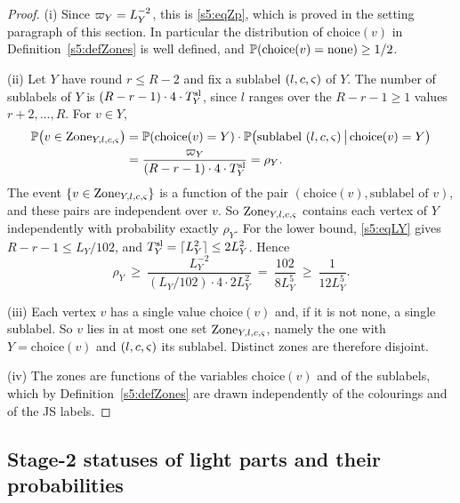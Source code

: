 \begin{proof}
(i) Since $\varpi_Y=L_Y^{-2}$, this is \eqref{s5:eqZp}, which is proved in the setting paragraph of this section. In particular the distribution of $\mathrm{choice}(v)$ in Definition~\ref{s5:defZones} is well defined, and $\mathbb{P}(\mathrm{choice}(v)=\mathrm{none})\ge 1/2$.

(ii) Let $Y$ have round $r\le R-2$ and fix a sublabel $(l,c,\varsigma)$ of $Y$. The number of sublabels of $Y$ is $(R-r-1)\cdot4\cdot T^{\mathrm{sl}}_Y$, since $l$ ranges over the $R-r-1\ge 1$ values $r+2,\dots,R$. For $v\in Y$,
\begin{align*}
\mathbb{P}\bigl(v\in\mathrm{Zone}_{Y,l,c,\varsigma}\bigr)&=\mathbb{P}(\mathrm{choice}(v)=Y)\cdot\mathbb{P}\bigl(\text{sublabel }(l,c,\varsigma)\,\big|\,\mathrm{choice}(v)=Y\bigr)\\
&=\frac{\varpi_Y}{(R-r-1)\cdot4\cdot T^{\mathrm{sl}}_Y}=\rho_Y .
\end{align*}
The event $\{v\in\mathrm{Zone}_{Y,l,c,\varsigma}\}$ is a function of the pair $(\mathrm{choice}(v),\text{sublabel of }v)$, and these pairs are independent over $v$. So $\mathrm{Zone}_{Y,l,c,\varsigma}$ contains each vertex of $Y$ independently with probability exactly $\rho_Y$. For the lower bound, \eqref{s5:eqLY} gives $R-r-1\le L_Y/102$, and $T^{\mathrm{sl}}_Y=\lceil L_Y^2\rceil\le 2L_Y^2$. Hence
\[
\rho_Y\ \ge\ \frac{L_Y^{-2}}{(L_Y/102)\cdot4\cdot 2L_Y^2}\ =\ \frac{102}{8L_Y^5}\ \ge\ \frac{1}{12L_Y^5}.
\]

(iii) Each vertex $v$ has a single value $\mathrm{choice}(v)$ and, if it is not $\mathrm{none}$, a single sublabel. So $v$ lies in at most one set $\mathrm{Zone}_{Y,l,c,\varsigma}$, namely the one with $Y=\mathrm{choice}(v)$ and $(l,c,\varsigma)$ its sublabel. Distinct zones are therefore disjoint.

(iv) The zones are functions of the variables $\mathrm{choice}(v)$ and of the sublabels, which by Definition~\ref{s5:defZones} are drawn independently of the colourings and of the JS labels.
\end{proof}

\subsection{Stage-2 statuses of light parts and their probabilities}

